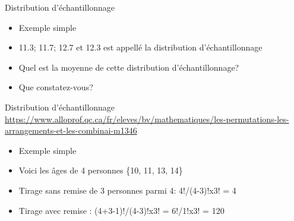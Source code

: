 \documentclass[
  ignorenonframetext,
]{beamer}
\providecommand{\tightlist}{%
  \setlength{\itemsep}{0pt}\setlength{\parskip}{0pt}}
\begin{document}
\begin{frame}{Distribution d'échantillonnage}
\protect\hypertarget{distribution-duxe9chantillonnage-3}{}
\begin{itemize}
\tightlist
\item
  Exemple simple
\end{itemize}

\begin{itemize}[<+->]
\tightlist
\item
  11.3; 11.7; 12.7 et 12.3 est appellé la distribution d'échantillonnage
\end{itemize}

\begin{itemize}
\tightlist
\item
  Quel est la moyenne de cette distribution d'échantillonnage?
\item
  Que constatez-vous?
\end{itemize}
\end{frame}

\begin{frame}{Distribution d'échantillonnage}
\protect\hypertarget{distribution-duxe9chantillonnage-4}{}
\url{https://www.alloprof.qc.ca/fr/eleves/bv/mathematiques/les-permutations-les-arrangements-et-les-combinai-m1346}

\begin{itemize}
\item
  Exemple simple
\item
  Voici les âges de 4 personnes \{10, 11, 13, 14\}
\item
  Tirage sans remise de 3 personnes parmi 4: 4!/(4-3)!x3! = 4
\item
  Tirage avec remise : (4+3-1)!/(4-3)!x3! = 6!/1!x3! = 120
\end{itemize}
\end{frame}
\end{document}
